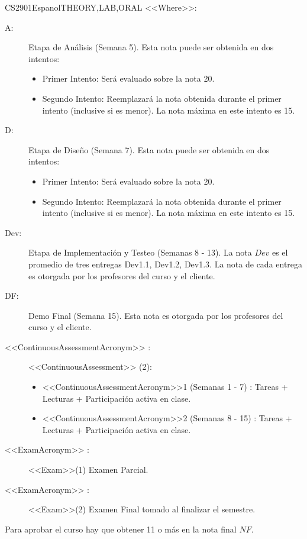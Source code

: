 \begin{evaluation}{CS2901}{Espanol}{THEORY,LAB,ORAL}
  \vspace{2mm}
  \noindent <<Where>>:
  \begin{description}
    \item[A:] Etapa de Análisis (Semana 5). Esta nota puede ser obtenida en dos intentos:
      \begin{itemize}
        \item[] Primer Intento: Será evaluado sobre la nota 20.
        \item[] Segundo Intento: Reemplazará la nota obtenida durante el primer intento (inclusive si es menor). La nota máxima en este intento es 15.
      \end{itemize}
    \item[D:] Etapa de Diseño (Semana 7). Esta nota puede ser obtenida en dos intentos:
      \begin{itemize}
        \item[] Primer Intento: Será evaluado sobre la nota 20.
        \item[] Segundo Intento: Reemplazará la nota obtenida durante el primer intento (inclusive si es menor). La nota máxima en este intento es 15.
      \end{itemize}
    \item[Dev:] Etapa de Implementación y Testeo (Semanas 8 - 13). La nota $Dev$ es el promedio de tres entregas Dev1.1, Dev1.2, Dev1.3. La nota de cada entrega es otorgada por los profesores del curso y el cliente.
    \item[DF:] Demo Final (Semana 15). Esta nota es otorgada por los profesores del curso y el cliente.
    \item[<<ContinuousAssessmentAcronym>> :] <<ContinuousAssessment>> (2):
      \begin{itemize}
          \item  <<ContinuousAssessmentAcronym>>1 (Semanas 1 - 7)  : Tareas + Lecturas + Participación activa en clase.
          \item <<ContinuousAssessmentAcronym>>2 (Semanas 8 - 15) : Tareas + Lecturas + Participación activa en clase.
      \end{itemize}
    \item[<<ExamAcronym>> :]  <<Exam>>(1) Examen Parcial.
    \item[<<ExamAcronym>> :]  <<Exam>>(2) Examen Final tomado al finalizar el semestre.
  \end{description}
 
  \noindent Para aprobar el curso hay que obtener 11 o más en la nota final $NF$.
  \end{evaluation}
 
